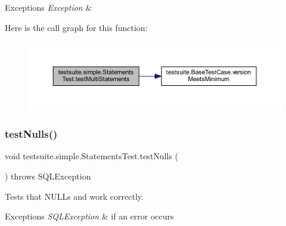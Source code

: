 \begin{DoxyExceptions}{Exceptions}
{\em Exception} & \\
\hline
\end{DoxyExceptions}
Here is the call graph for this function\+:
\nopagebreak
\begin{figure}[H]
\begin{center}
\leavevmode
\includegraphics[width=350pt]{classtestsuite_1_1simple_1_1_statements_test_a8be371b068b81e39350ba4e2b1287800_cgraph}
\end{center}
\end{figure}
\mbox{\label{classtestsuite_1_1simple_1_1_statements_test_a7c77d0eff3cc940b6335415ad52cfea8}} 
\subsubsection{\texorpdfstring{test\+Nulls()}{testNulls()}}
{\footnotesize\ttfamily void testsuite.\+simple.\+Statements\+Test.\+test\+Nulls (\begin{DoxyParamCaption}{ }\end{DoxyParamCaption}) throws S\+Q\+L\+Exception}

Tests that N\+U\+L\+Ls and \textquotesingle{}\textquotesingle{} work correctly.


\begin{DoxyExceptions}{Exceptions}
{\em S\+Q\+L\+Exception} & if an error occurs \\
\hline
\end{DoxyExceptions}
\mbox{\label{classtestsuite_1_1simple_1_1_statements_test_acf80cede1ff53fcdebca2de611a1c015}} 
